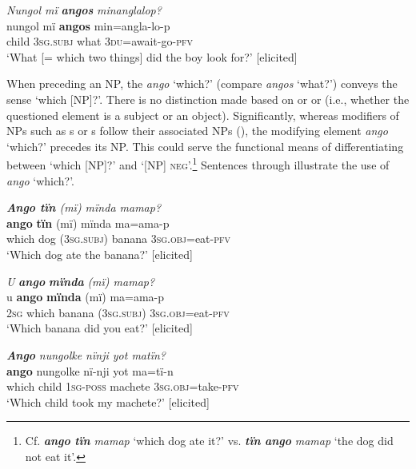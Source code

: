 \ea%
    \label{ex:pron:60}
          \textit{Nungol mï} \textbf{\textit{angos}} \textit{minanglalop?}\\
\gll nungol  mï      \textbf{angos}  min=angla-lo-p\\
    child  3\textsc{sg.subj}  what  \textsc{3du}=await-go-\textsc{pfv}\\
\glt `What [= which two things] did the boy look for?’ [elicited]
\z

When preceding an NP, the  \textit{ango} ‘which?’ (compare \textit{angos} ‘what?’) conveys the sense ‘which [NP]?’. There is no distinction made based on  or  or  (i.e., whether the questioned element is a subject or an object). Significantly, whereas modifiers of NPs such as s or s follow their associated NPs (), the modifying element \textit{ango} ‘which?’ precedes its NP. This could serve the functional means of differentiating between ‘which [NP]?’ and ‘[NP] \textsc{neg}’.\footnote{Cf. \textbf{\textit{ango} \textit{tïn}} \textit{mamap} ‘which dog ate it?’ vs. \textbf{\textit{tïn} \textit{ango}} \textit{mamap} ‘the dog did not eat it’.} Sentences  through  illustrate the use of \textit{ango} ‘which?’.

\ea%
    \label{ex:pron:61}
          \textit{\textbf{Ango tïn} (mï) mïnda mamap?}\\
\gll \textbf{ango}  \textbf{tïn}    (mï)    mïnda    ma=ama-p\\
    which  dog  (\textsc{3sg.subj)}  banana    \textsc{3sg.obj}=eat-\textsc{pfv}\\
\glt `Which dog ate the banana?’ [elicited]
\z

\ea%
    \label{ex:pron:62}
          \textit{U} \textbf{\textit{ango}} \textbf{\textit{mïnda}} \textit{(mï) mamap?}\\
\gll u    \textbf{ango}  \textbf{mïnda}  (mï)    ma=ama-p\\
    \textsc{2sg}  which  banana  (\textsc{3sg.subj)}  \textsc{3sg.obj}=eat-\textsc{pfv}\\
\glt `Which banana did you eat?’ [elicited]
\z

\ea%
    \label{ex:pron:63}
         \textbf{\textit{Ango}} \textit{nungolke nïnji yot matïn?}\\
\gll \textbf{ango}  nungolke  nï-nji    yot      ma=tï-n\\
    which  child    \textsc{1sg-poss}  machete  \textsc{3sg.obj=}take-\textsc{pfv}\\
\glt `Which child took my machete?’ [elicited]
\z

